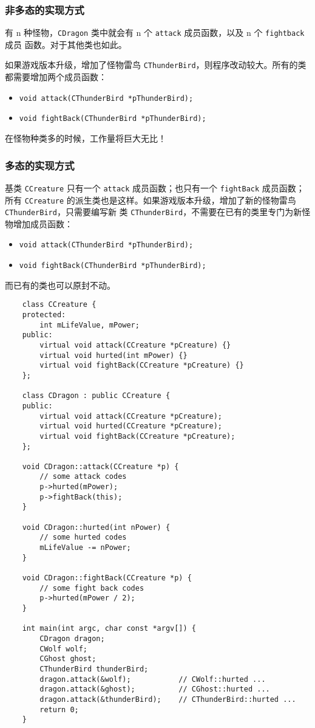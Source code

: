 \documentclass[UTF8]{ctexart}
\begin{document}
\subsubsection{非多态的实现方式}
有 n 种怪物，\texttt{CDragon} 类中就会有 n 个 \texttt{attack} 成员函数，以及 n 个 \texttt{fightback} 成员
函数。对于其他类也如此。

如果游戏版本升级，增加了怪物雷鸟 \texttt{CThunderBird}，则程序改动较大。所有的类都需要增加两个成员函数：
\begin{itemize}
    \item \texttt{void attack(CThunderBird *pThunderBird);}
    \item \texttt{void fightBack(CThunderBird *pThunderBird);}
\end{itemize}

在怪物种类多的时候，工作量将巨大无比！

\subsubsection{多态的实现方式}
基类 \texttt{CCreature} 只有一个 \texttt{attack} 成员函数；也只有一个 \texttt{fightBack} 成员函数；所有
\texttt{CCreature} 的派生类也是这样。如果游戏版本升级，增加了新的怪物雷鸟 \texttt{CThunderBird}，只需要编写新
类 \texttt{CThunderBird}，不需要在已有的类里专门为新怪物增加成员函数：
\begin{itemize}
    \item \texttt{void attack(CThunderBird *pThunderBird);}
    \item \texttt{void fightBack(CThunderBird *pThunderBird);}
\end{itemize}
而已有的类也可以原封不动。

\begin{verbatim}
    class CCreature {
    protected:
        int mLifeValue, mPower;
    public:
        virtual void attack(CCreature *pCreature) {}
        virtual void hurted(int mPower) {}
        virtual void fightBack(CCreature *pCreature) {}
    };

    class CDragon : public CCreature {
    public:
        virtual void attack(CCreature *pCreature);
        virtual void hurted(CCreature *pCreature);
        virtual void fightBack(CCreature *pCreature);
    };

    void CDragon::attack(CCreature *p) {
        // some attack codes
        p->hurted(mPower);
        p->fightBack(this);
    }

    void CDragon::hurted(int nPower) {
        // some hurted codes
        mLifeValue -= nPower;
    }

    void CDragon::fightBack(CCreature *p) {
        // some fight back codes
        p->hurted(mPower / 2);
    }

    int main(int argc, char const *argv[]) {
        CDragon dragon;
        CWolf wolf;
        CGhost ghost;
        CThunderBird thunderBird;
        dragon.attack(&wolf);           // CWolf::hurted ...
        dragon.attack(&ghost);          // CGhost::hurted ...
        dragon.attack(&thunderBird);    // CThunderBird::hurted ...
        return 0;
    }
\end{verbatim}
\end{document}
